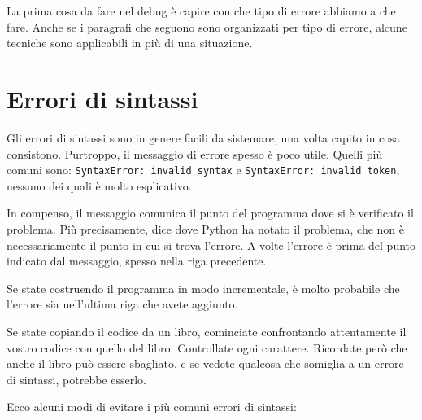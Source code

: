 \documentclass[10pt]{book}
\begin{document}
La prima cosa da fare nel debug è capire con che tipo di errore abbiamo a che fare. Anche se i paragrafi che seguono sono organizzati per tipo di errore, alcune tecniche sono applicabili in più di una situazione.


\section{Errori di sintassi}

Gli errori di sintassi sono in genere facili da sistemare, una volta capito in cosa consistono. Purtroppo, il messaggio di errore spesso è poco utile. Quelli più comuni sono: {\tt SyntaxError: invalid syntax} e
{\tt SyntaxError: invalid token}, nessuno dei quali è molto esplicativo.

In compenso, il messaggio comunica il punto del programma dove si è verificato il problema. Più precisamente, dice dove Python ha notato il problema, che non è necessariamente il punto in cui si trova l'errore.
A volte l'errore è prima del punto indicato dal messaggio, spesso nella riga precedente.

Se state costruendo il programma in modo incrementale, è molto probabile che l'errore sia nell'ultima riga che avete aggiunto.

Se state copiando il codice da un libro, cominciate confrontando attentamente il vostro codice con quello del libro. Controllate ogni carattere. Ricordate però che anche il libro può essere sbagliato, e se vedete qualcosa che somiglia a un errore di sintassi, potrebbe esserlo.

Ecco alcuni modi di evitare i più comuni errori di sintassi:
\end{document}
